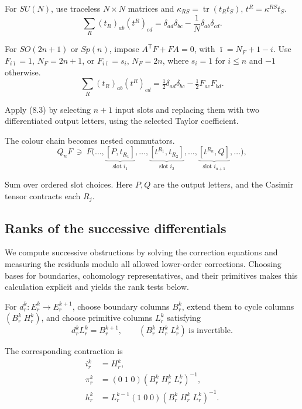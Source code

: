 \documentclass[11pt]{article}
\numberwithin{equation}{section}
\numberwithin{figure}{section}
\numberwithin{table}{section}
\begin{document}
For $SU(N)$, use traceless $N\times N$ matrices and $\kappa_{RS}=\operatorname{tr}(t_Rt_S)$, $t^R=\kappa^{RS}t_S$.
\begin{equation*}
\sum_R(t_R)_{ab}(t^R)_{cd}=\delta_{ad}\delta_{bc}-\frac1N\delta_{ab}\delta_{cd}.
\end{equation*}

For $SO(2n+1)$ or $Sp(n)$, impose $A^{\mathsf T}F+FA=0$, with $\bar\imath=N_F+1-i$. Use $F_{i\bar\imath}=1$, $N_F=2n+1$, or $F_{i\bar\imath}=s_i$, $N_F=2n$, where $s_i=1$ for $i\le n$ and $-1$ otherwise.
\begin{equation}\label{eq-E-casimir}
\sum_R(t_R)_{ab}(t^R)_{cd}=\tfrac12\delta_{ad}\delta_{bc}-\tfrac12F_{ac}F_{bd}.
\end{equation}

Apply (8.3) by selecting $n+1$ input slots and replacing them with two differentiated output letters, using the selected Taylor coefficient.

The colour chain becomes nested commutators.
\begin{equation}\label{eq-E-chain}
Q_nF\ \ni\ F\bigl(\ldots,\underbrace{[P,t_{R_1}]}_{\text{slot }i_1},\ldots,\underbrace{[t^{R_1},t_{R_2}]}_{\text{slot }i_2},\ldots,\underbrace{[t^{R_n},Q]}_{\text{slot }i_{n+1}},\ldots\bigr),
\end{equation}

Sum over ordered slot choices. Here $P,Q$ are the output letters, and the Casimir tensor contracts each $R_j$.

\subsection{Ranks of the successive differentials}\label{sec-E-pages}

We compute successive obstructions by solving the correction equations and measuring the residuals modulo all allowed lower-order corrections. Choosing bases for boundaries, cohomology representatives, and their primitives makes this calculation explicit and yields the rank tests below.

For $d_r^k:E_r^k\to E_r^{k+1}$, choose boundary columns $B_r^k$, extend them to cycle columns $(B_r^k\;H_r^k)$, and choose primitive columns $L_r^k$ satisfying
\begin{equation}\label{eq-page-basis-splitting}
d_r^kL_r^k=B_r^{k+1},\qquad
(B_r^k\;H_r^k\;L_r^k)\ \text{is invertible}.
\end{equation}

The corresponding contraction is
\begin{equation}\label{eq-page-matrix-contraction}
\begin{aligned}
i_r^k&=H_r^k,\\
\pi_r^k&=(0\;1\;0)(B_r^k\;H_r^k\;L_r^k)^{-1},\\
h_r^k&=L_r^{k-1}(1\;0\;0)(B_r^k\;H_r^k\;L_r^k)^{-1}.
\end{aligned}
\end{equation}
\end{document}
